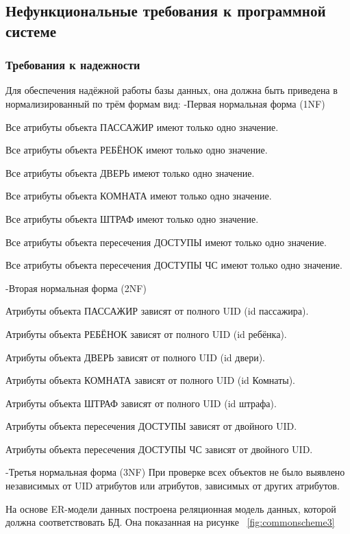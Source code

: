 \subsection {Нефункциональные требования к программной системе}
\subsubsection{Требования к надежности}
Для обеспечения надёжной работы базы данных, она должна быть приведена в нормализированный по трём формам вид:
-Первая нормальная форма (1NF)

Все атрибуты объекта ПАССАЖИР имеют только одно значение.

Все атрибуты объекта РЕБЁНОК имеют только одно значение.

Все атрибуты объекта ДВЕРЬ имеют только одно значение.

Все атрибуты объекта КОМНАТА имеют только одно значение.

Все атрибуты объекта ШТРАФ имеют только одно значение.

Все атрибуты объекта пересечения ДОСТУПЫ имеют только одно значение.

Все атрибуты объекта пересечения ДОСТУПЫ ЧС имеют только одно значение.


-Вторая нормальная форма (2NF)

Атрибуты объекта ПАССАЖИР зависят от полного UID (id пассажира).

Атрибуты объекта РЕБЁНОК зависят от полного UID (id ребёнка).

Атрибуты объекта ДВЕРЬ зависят от полного UID (id двери).

Атрибуты объекта КОМНАТА зависят от полного UID (id Комнаты).

Атрибуты объекта ШТРАФ зависят от полного UID (id штрафа).

Атрибуты объекта пересечения ДОСТУПЫ зависят от двойного UID.

Атрибуты объекта пересечения ДОСТУПЫ ЧС зависят от двойного UID.


-Третья нормальная форма (3NF)
При проверке всех объектов не было выявлено независимых от UID атрибутов или атрибутов, зависимых от других атрибутов.

На основе ER-модели данных построена реляционная модель данных, которой должна соответствовать БД. Она показанная на рисунке  ~\ref{fig:commonscheme3}

